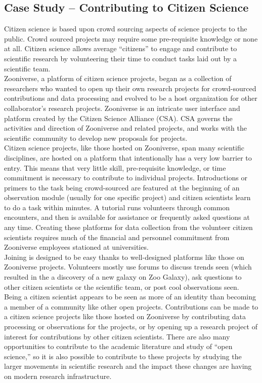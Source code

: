 \subsection{Case Study -- Contributing to Citizen Science}

Citizen science is based upon crowd sourcing aspects of science projects to the public. Crowd sourced projects may require some pre-requisite knowledge or none at all. Citizen science allows average “citizens” to engage and contribute to scientific research by volunteering their time to conduct tasks laid out by a scientific team. \\
 
\noindent Zooniverse, a platform of citizen science projects, began as a collection of researchers who wanted to open up their own research projects for crowd-sourced contributions and data processing and evolved to be a host organization for other collaborator’s research projects. Zooniverse is an intricate user interface and platform created by the Citizen Science Alliance (CSA). CSA governs the activities and direction of Zooniverse and related projects, and works with the scientific community to develop new proposals for projects. \\
 
\noindent Citizen science projects, like those hosted on Zooniverse, span many scientific disciplines, are hosted on a platform that intentionally has a very low barrier to entry. This means that very little skill, pre-requisite knowledge, or time commitment is necessary to contribute to individual projects. Introductions or primers to the task being crowd-sourced are featured at the beginning of an observation module (usually for one specific project) and citizen scientists learn to do a task within minutes. A tutorial runs volunteers through common encounters, and then is available for assistance or frequently asked questions at any time. Creating these platforms for data collection from the volunteer citizen scientists requires much of the financial and personnel commitment from Zooniverse employees stationed at universities. \\
 
\noindent Joining is designed to be easy thanks to well-designed platforms like those on Zooniverse projects. Volunteers mostly use forums to discuss trends seen (which resulted in the a discovery of a new galaxy on Zoo Galaxy), ask questions to other citizen scientists or the scientific team, or post cool observations seen. Being a citizen scientist appears to be seen as more of an identity than becoming a member of a community like other open projects. Contributions can be made to a citizen science projects like those hosted on Zooniverse by contributing data processing or observations for the projects, or by opening up a research project of interest for contributions by other citizen scientists. There are also many opportunities to contribute to the academic literature and study of “open science,” so it is also possible to contribute to these projects by studying the larger movements in scientific research and the impact these changes are having on modern research infrastructure. \\
 

